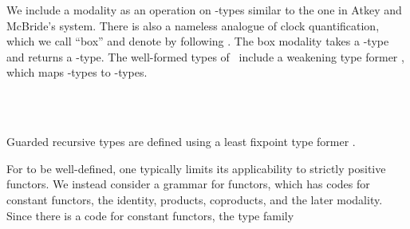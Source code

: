 \begin{AgdaAlign}
We include a modality  as an operation on -types similar to the one in Atkey and McBride's system.
There is also a nameless analogue of clock quantification, which we call ``box'' and denote by 
following \cite{CloustonBGB15}. The box modality takes a
-type and returns a -type. The well-formed types of \GTT\
include a weakening type former , which maps -types to
\IC{κ}-types.
\begin{code}%
%
\>[4]\AgdaSpace{}%
\AgdaSymbol{:}\AgdaSpace{}%
\AgdaSpace{}%
\AgdaSpace{}%
\AgdaSpace{}%
\AgdaSpace{}%
\<%
\\
%
\>[4]\AgdaSpace{}%
\AgdaSymbol{:}\AgdaSpace{}%
\AgdaSpace{}%
\AgdaSpace{}%
\AgdaSpace{}%
\AgdaSpace{}%
\<%
\\
%
\>[4]\AgdaSpace{}%
\AgdaSymbol{:}\AgdaSpace{}%
\AgdaSpace{}%
\AgdaSpace{}%
\AgdaSpace{}%
\AgdaSpace{}%
\<%
\end{code}

Guarded recursive types are defined using a least fixpoint
type former .
\begin{code}%
%
\>[4]\AgdaSpace{}%
\AgdaSymbol{:}\AgdaSpace{}%
\AgdaSpace{}%
\AgdaSymbol{\{}\AgdaSymbol{\}}\AgdaSpace{}%
\AgdaSpace{}%
\AgdaSpace{}%
\AgdaSpace{}%
\AgdaSpace{}%
\AgdaSpace{}%
\<%
\end{code}
\end{AgdaAlign}
For  to be well-defined, one typically limits
its applicability to strictly positive functors. We instead consider
a grammar \F{Code} \Ar{Δ} for functors, which has codes for constant functors,
the identity, products, coproducts, and the later modality.
Since there is a code for constant functors, the type family

